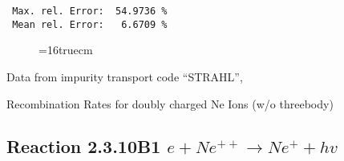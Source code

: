 \documentclass[12pt,dvipdfmx]{article}
\begin{document}
\begin{small}
\begin{verbatim}
 Max. rel. Error:  54.9736 %
 Mean rel. Error:   6.6709 %

\end{verbatim}\end{small}
\begin{figure} \label{2.3.10B0}
\epsfxsize=16truecm
\end{figure}
\newpage
Data from impurity transport code ``STRAHL'', \cite{kn:Behringer}

  Recombination Rates for doubly  charged Ne Ions (w/o threebody)
\subsection{
Reaction 2.3.10B1   $e + Ne^{++}\rightarrow  Ne^+ + hv$
}
\end{document}
